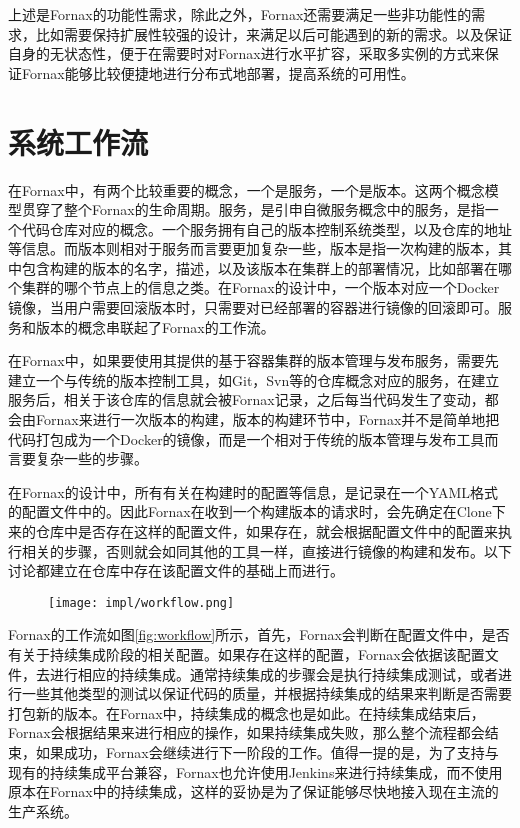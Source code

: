 上述是Fornax的功能性需求，除此之外，Fornax还需要满足一些非功能性的需求，比如需要保持扩展性较强的设计，来满足以后可能遇到的新的需求。以及保证自身的无状态性，便于在需要时对Fornax进行水平扩容，采取多实例的方式来保证Fornax能够比较便捷地进行分布式地部署，提高系统的可用性。

\section{系统工作流}

在Fornax中，有两个比较重要的概念，一个是服务，一个是版本。这两个概念模型贯穿了整个Fornax的生命周期。服务，是引申自微服务概念中的服务，是指一个代码仓库对应的概念。一个服务拥有自己的版本控制系统类型，以及仓库的地址等信息。而版本则相对于服务而言要更加复杂一些，版本是指一次构建的版本，其中包含构建的版本的名字，描述，以及该版本在集群上的部署情况，比如部署在哪个集群的哪个节点上的信息之类。在Fornax的设计中，一个版本对应一个Docker镜像，当用户需要回滚版本时，只需要对已经部署的容器进行镜像的回滚即可。服务和版本的概念串联起了Fornax的工作流。

在Fornax中，如果要使用其提供的基于容器集群的版本管理与发布服务，需要先建立一个与传统的版本控制工具，如Git，Svn等的仓库概念对应的服务，在建立服务后，相关于该仓库的信息就会被Fornax记录，之后每当代码发生了变动，都会由Fornax来进行一次版本的构建，版本的构建环节中，Fornax并不是简单地把代码打包成为一个Docker的镜像，而是一个相对于传统的版本管理与发布工具而言要复杂一些的步骤。

在Fornax的设计中，所有有关在构建时的配置等信息，是记录在一个YAML格式的配置文件中的。因此Fornax在收到一个构建版本的请求时，会先确定在Clone下来的仓库中是否存在这样的配置文件，如果存在，就会根据配置文件中的配置来执行相关的步骤，否则就会如同其他的工具一样，直接进行镜像的构建和发布。以下讨论都建立在仓库中存在该配置文件的基础上而进行。

\begin{figure}[!htp]
  \centering
  \texttt{[image: impl/workflow.png]}
\end{figure}

Fornax的工作流如图\ref{fig:workflow}所示，首先，Fornax会判断在配置文件中，是否有关于持续集成阶段的相关配置。如果存在这样的配置，Fornax会依据该配置文件，去进行相应的持续集成。通常持续集成的步骤会是执行持续集成测试，或者进行一些其他类型的测试以保证代码的质量，并根据持续集成的结果来判断是否需要打包新的版本。在Fornax中，持续集成的概念也是如此。在持续集成结束后，Fornax会根据结果来进行相应的操作，如果持续集成失败，那么整个流程都会结束，如果成功，Fornax会继续进行下一阶段的工作。值得一提的是，为了支持与现有的持续集成平台兼容，Fornax也允许使用Jenkins来进行持续集成，而不使用原本在Fornax中的持续集成，这样的妥协是为了保证能够尽快地接入现在主流的生产系统。

